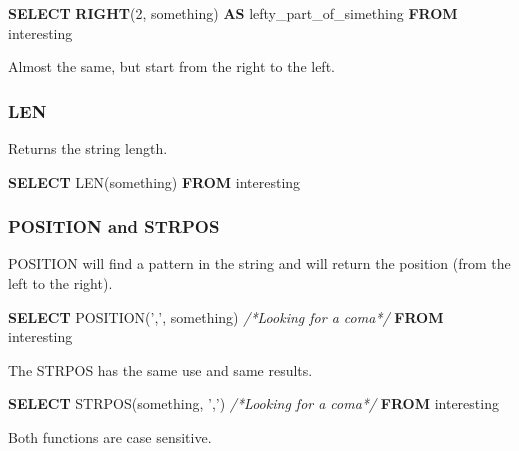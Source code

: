 \documentclass[]{book}
\newenvironment{Shaded}{\begin{snugshade}}{\end{snugshade}}
\newcommand{\KeywordTok}[1]{\textcolor[rgb]{0.13,0.29,0.53}{\textbf{#1}}}
\newcommand{\DecValTok}[1]{\textcolor[rgb]{0.00,0.00,0.81}{#1}}
\newcommand{\StringTok}[1]{\textcolor[rgb]{0.31,0.60,0.02}{#1}}
\newcommand{\CommentTok}[1]{\textcolor[rgb]{0.56,0.35,0.01}{\textit{#1}}}
\newcommand{\NormalTok}[1]{#1}
\begin{document}
\begin{Shaded}
\begin{Highlighting}[]
\KeywordTok{SELECT} \KeywordTok{RIGHT}\NormalTok{(}\DecValTok{2}\NormalTok{, something) }\KeywordTok{AS}\NormalTok{ lefty_part_of_simething}
\KeywordTok{FROM}\NormalTok{ interesting}
\end{Highlighting}
\end{Shaded}

Almost the same, but start from the right to the left.

\subsubsection{LEN}\label{len}

Returns the string length.

\begin{Shaded}
\begin{Highlighting}[]
\KeywordTok{SELECT}\NormalTok{ LEN(something)}
\KeywordTok{FROM}\NormalTok{ interesting}
\end{Highlighting}
\end{Shaded}

\subsubsection{POSITION and STRPOS}\label{position-and-strpos}

POSITION will find a pattern in the string and will return the position
(from the left to the right).

\begin{Shaded}
\begin{Highlighting}[]
\KeywordTok{SELECT}\NormalTok{ POSITION(}\StringTok{','}\NormalTok{, something) }\CommentTok{/*Looking for a coma*/}
\KeywordTok{FROM}\NormalTok{ interesting}
\end{Highlighting}
\end{Shaded}

The STRPOS has the same use and same results.

\begin{Shaded}
\begin{Highlighting}[]
\KeywordTok{SELECT}\NormalTok{ STRPOS(something, }\StringTok{','}\NormalTok{) }\CommentTok{/*Looking for a coma*/}
\KeywordTok{FROM}\NormalTok{ interesting}
\end{Highlighting}
\end{Shaded}

Both functions are case sensitive.
\end{document}
